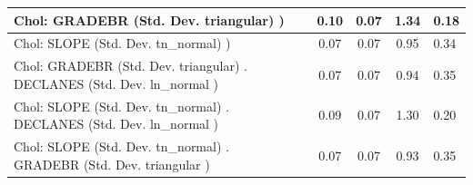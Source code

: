 \begin{table}
\begin{center}
\begin{tabular}{|l|l|c|c|c|l|}
			\hline
			 Chol: GRADEBR (Std. Dev. triangular) ) &  & 0.10 & 0.07 & 1.34 & 0.18 \\
			\hline
			 Chol: SLOPE (Std. Dev. tn_normal) ) &  & 0.07 & 0.07 & 0.95 & 0.34 \\
			\hline
			 Chol: GRADEBR (Std. Dev. triangular) . DECLANES (Std. Dev.   ln_normal ) &  & 0.07 & 0.07 & 0.94 & 0.35 \\
			\hline
			 Chol: SLOPE (Std. Dev. tn_normal) . DECLANES (Std. Dev.   ln_normal ) &  & 0.09 & 0.07 & 1.30 & 0.20 \\
			\hline
			 Chol: SLOPE (Std. Dev. tn_normal) . GRADEBR (Std. Dev.   triangular ) &  & 0.07 & 0.07 & 0.93 & 0.35 \\
			\hline
		\end{tabular}
	\end{center}
\end{table}